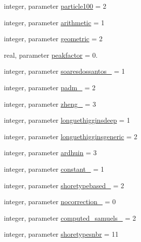 \begin{DoxyCompactItemize}
\item 
integer, parameter \mbox{\hyperlink{namespacemodulelagrangianglobal_a11d3726a417de8d928874f53f2e8d759}{particle100}} = 2
\item 
integer, parameter \mbox{\hyperlink{namespacemodulelagrangianglobal_a837ab16272dfe57078d78e90cf4c1240}{arithmetic}} = 1
\item 
integer, parameter \mbox{\hyperlink{namespacemodulelagrangianglobal_a661d6efc659f0c7f7b85158f0c4e1d98}{geometric}} = 2
\item 
real, parameter \mbox{\hyperlink{namespacemodulelagrangianglobal_a99e43c25546e6fa95e08c400d6a21460}{peakfactor}} = 0.
\item 
integer, parameter \mbox{\hyperlink{namespacemodulelagrangianglobal_a045b00b0bf74d2b3aa1c88ed126390a1}{soaresdossantos\+\_\+}} = 1
\item 
integer, parameter \mbox{\hyperlink{namespacemodulelagrangianglobal_a2ae762c82187b0f444aecdfc5929627b}{padm\+\_\+}} = 2
\item 
integer, parameter \mbox{\hyperlink{namespacemodulelagrangianglobal_ae1877dfc79c08df3b0c92dad1f6cfadc}{zheng\+\_\+}} = 3
\item 
integer, parameter \mbox{\hyperlink{namespacemodulelagrangianglobal_a5ba72823c8585af566872f84164c343e}{longuethigginsdeep}} = 1
\item 
integer, parameter \mbox{\hyperlink{namespacemodulelagrangianglobal_a90f80a166b384ba2e71ad5017fa9e37f}{longuethigginsgeneric}} = 2
\item 
integer, parameter \mbox{\hyperlink{namespacemodulelagrangianglobal_a0a1e7b7db30846e92b7f5c98e665c0c7}{ardhuin}} = 3
\item 
integer, parameter \mbox{\hyperlink{namespacemodulelagrangianglobal_a8d09d3f68ddd2e33f66ccf023f0be8e8}{constant\+\_\+}} = 1
\item 
integer, parameter \mbox{\hyperlink{namespacemodulelagrangianglobal_ab7750a2f4ac9b6bfeb36230e86a95e8e}{shoretypebased\+\_\+}} = 2
\item 
integer, parameter \mbox{\hyperlink{namespacemodulelagrangianglobal_aa365610a35e8bf7f2e7952a4ea0fd16a}{nocorrection\+\_\+}} = 0
\item 
integer, parameter \mbox{\hyperlink{namespacemodulelagrangianglobal_ab8fcc87a00faad18e9cac3e9e65fac08}{computed\+\_\+samuels\+\_\+}} = 2
\item 
integer, parameter \mbox{\hyperlink{namespacemodulelagrangianglobal_a13654ed8e4e6ce2c40ea217aaa09b53e}{shoretypesnbr}} = 11
\item 

\end{DoxyCompactItemize}
